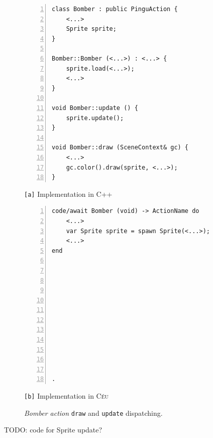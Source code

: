 \documentclass{vgtc}                          %
\newcommand{\CEU}{\textsc{C\'{e}u}\xspace}
\newcommand{\code}[1] {{\small{\texttt{#1}}}}
\newcommand{\ax}{\code{[a]}\xspace}
\newcommand{\bx}{\code{[b]}\xspace}
\begin{document}
\begin{figure}[t]
\begin{minipage}[t]{0.50\linewidth}
\begin{lstlisting}[numbers=left,xleftmargin=3em]
class Bomber : public PinguAction {
    <...>
    Sprite sprite;
}

Bomber::Bomber (<...>) : <...> {
    sprite.load(<...>);
    <...>
}

void Bomber::update () {
    sprite.update();
}

void Bomber::draw (SceneContext& gc) {
    <...>
    gc.color().draw(sprite, <...>);
}
\end{lstlisting}
\centering\small{\ax Implementation in C++}
\end{minipage}
%
\begin{minipage}[t]{0.50\linewidth}
\begin{lstlisting}[numbers=left,xleftmargin=3em]
code/await Bomber (void) -> ActionName do
    <...>
    var Sprite sprite = spawn Sprite(<...>);
    <...>
end












.
\end{lstlisting}
\centering\small{\bx Implementation in \CEU}
\end{minipage}
\caption{ \emph{Bomber action} \code{draw} and \code{update} dispatching.
\label{lst.hier}
}
\end{figure}

TODO: code for Sprite update?
\end{document}
